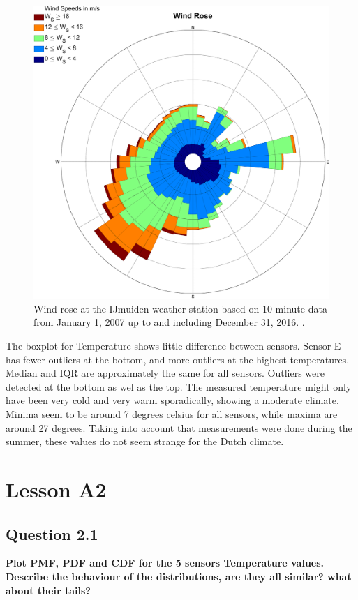 \documentclass{report}
\begin{document}
	
	
	\begin{figure}[H]
		\centering
		\includegraphics[width=0.7\linewidth]{GEO1001_hw01_images/WindRose_IJmuiden.png}
		\caption{ Wind rose at the IJmuiden weather station based on 10-minute data from January 1, 2007 up to and including December 31, 2016. \cite{journalpone}.}
		\label{fig:winddirnl}
	\end{figure}
	
	\newpage %
	The boxplot for Temperature shows little difference between sensors. Sensor E has fewer outliers at the bottom, and more outliers at the highest temperatures. Median and IQR are approximately the same for all sensors. Outliers were detected at the bottom as wel as the top. The measured temperature might only have been very cold and very warm sporadically, showing a moderate climate. Minima seem to be around 7 degrees celsius for all sensors, while maxima are around 27 degrees. Taking into account that measurements were done during the summer, these values do not seem strange for the Dutch climate.
	
	
	\section{Lesson A2}
	
	\subsection{Question 2.1}
	\textbf{Plot PMF, PDF and CDF for the 5 sensors Temperature values. Describe the behaviour of the distributions, are they all similar? what about their tails?}
	
\end{document}
